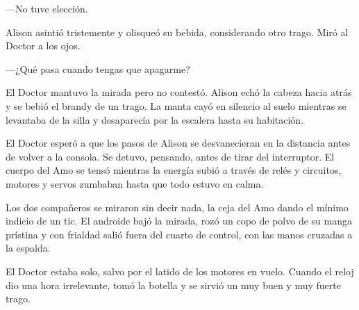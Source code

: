 {---No tuve elección.}

{Alison asintió tristemente y olisqueó su bebida, considerando otro
trago. Miró al Doctor a los ojos.}

{---¿Qué pasa cuando tengas que apagarme?}

{El Doctor mantuvo la mirada pero no contestó. Alison echó la cabeza
 hacia atrás y se bebió el brandy de un trago. La manta cayó en silencio
 al suelo mientras se levantaba de la silla y desaparecía por la escalera
hasta su habitación.}

{El Doctor esperó a que los pasos de Alison se desvanecieran en la
 distancia antes de volver a la consola. Se detuvo, pensando, antes de
 tirar del interruptor. El cuerpo del Amo se tensó mientras la energía
 subió a través de relés y circuitos, motores y servos zumbaban hasta
que todo estuvo en calma.}

{Los dos compañeros se miraron sin decir nada, la ceja del Amo dando el
 mínimo indicio de un tic. El androide bajó la mirada, rozó un copo de
 polvo de su manga prístina y con frialdad salió fuera del cuarto de
control, con las manos cruzadas a la espalda.}

{El Doctor estaba solo, salvo por el latido de los motores en vuelo.
 Cuando el reloj dio una hora irrelevante, tomó la botella y se sirvió un
muy buen y muy fuerte trago.}
